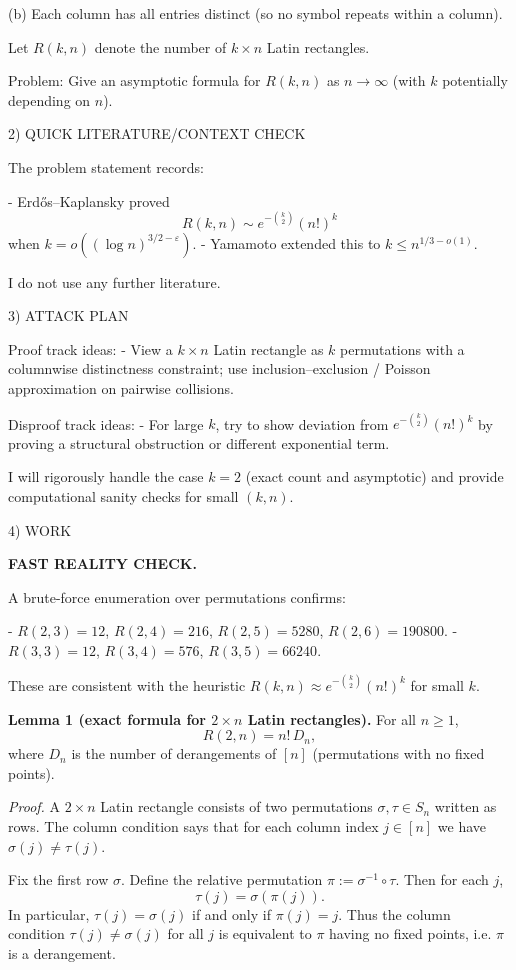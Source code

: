 (b) Each column has all entries distinct (so no symbol repeats within a column).

Let $R(k,n)$ denote the number of $k\times n$ Latin rectangles.

Problem: Give an asymptotic formula for $R(k,n)$ as $n\to\infty$ (with $k$ potentially depending on $n$).

2) QUICK LITERATURE/CONTEXT CHECK

The problem statement records:

- Erd\H{o}s--Kaplansky proved
  \[R(k,n) \sim e^{-\binom{k}{2}}(n!)^k\]
  when $k=o((\log n)^{3/2-\varepsilon})$.
- Yamamoto extended this to $k\le n^{1/3-o(1)}$.

I do not use any further literature.

3) ATTACK PLAN

Proof track ideas:
- View a $k\times n$ Latin rectangle as $k$ permutations with a columnwise distinctness constraint; use inclusion--exclusion / Poisson approximation on pairwise collisions.

Disproof track ideas:
- For large $k$, try to show deviation from $e^{-\binom{k}{2}}(n!)^k$ by proving a structural obstruction or different exponential term.

I will rigorously handle the case $k=2$ (exact count and asymptotic) and provide computational sanity checks for small $(k,n)$.

4) WORK

\textbf{FAST REALITY CHECK.}

A brute-force enumeration over permutations confirms:

- $R(2,3)=12$, $R(2,4)=216$, $R(2,5)=5280$, $R(2,6)=190800$.
- $R(3,3)=12$, $R(3,4)=576$, $R(3,5)=66240$.

These are consistent with the heuristic $R(k,n)\approx e^{-\binom{k}{2}}(n!)^k$ for small $k$.

\medskip

\textbf{Lemma 1 (exact formula for $2\times n$ Latin rectangles).}
For all $n\ge 1$,
\[
R(2,n) = n!\,D_n,
\]
where $D_n$ is the number of derangements of $[n]$ (permutations with no fixed points).

\emph{Proof.}
A $2\times n$ Latin rectangle consists of two permutations $\sigma,\tau\in S_n$ written as rows.
The column condition says that for each column index $j\in[n]$ we have $\sigma(j)\ne \tau(j)$.

Fix the first row $\sigma$. Define the relative permutation $\pi := \sigma^{-1}\circ\tau$.
Then for each $j$,
\[
\tau(j)=\sigma(\pi(j)).
\]
In particular, $\tau(j)=\sigma(j)$ if and only if $\pi(j)=j$.
Thus the column condition $\tau(j)\ne\sigma(j)$ for all $j$ is equivalent to $\pi$ having no fixed points, i.e. $\pi$ is a derangement.

